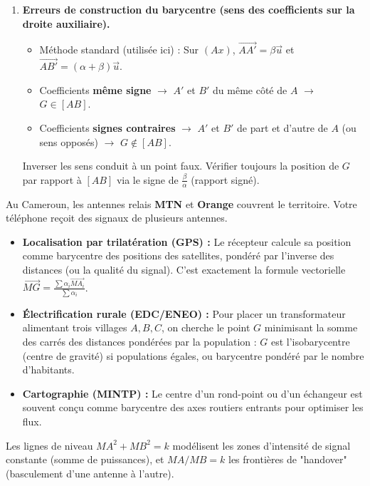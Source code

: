 \documentclass[11pt]{article}
\begin{document}
\begin{attention}
\begin{enumerate}
    \item \textbf{Erreurs de construction du barycentre (sens des coefficients sur la droite auxiliaire).}
    \begin{itemize}
        \item Méthode standard (utilisée ici) : Sur $(Ax)$, $\overrightarrow{AA'} = \beta \vec{u}$ et $\overrightarrow{AB'} = (\alpha+\beta)\vec{u}$.
        \item Coefficients \textbf{même signe} $\rightarrow$ $A'$ et $B'$ du même côté de $A$ $\rightarrow$ $G \in [AB]$.
        \item Coefficients \textbf{signes contraires} $\rightarrow$ $A'$ et $B'$ de part et d'autre de $A$ (ou sens opposés) $\rightarrow$ $G \notin [AB]$.
    \end{itemize}
    Inverser les sens conduit à un point faux. Vérifier toujours la position de $G$ par rapport à $[AB]$ via le signe de $\frac{\beta}{\alpha}$ (rapport signé).
\end{enumerate}
\end{attention}

\begin{savaistu}
Au Cameroun, les antennes relais \textbf{MTN} et \textbf{Orange} couvrent le territoire. Votre téléphone reçoit des signaux de plusieurs antennes.
\begin{itemize}
    \item \textbf{Localisation par trilatération (GPS) :} Le récepteur calcule sa position comme barycentre des positions des satellites, pondéré par l'inverse des distances (ou la qualité du signal). C'est exactement la formule vectorielle $\overrightarrow{MG} = \frac{\sum \alpha_i \overrightarrow{MA_i}}{\sum \alpha_i}$.
    \item \textbf{Électrification rurale (EDC/ENEO) :} Pour placer un transformateur alimentant trois villages $A, B, C$, on cherche le point $G$ minimisant la somme des carrés des distances pondérées par la population : $G$ est l'isobarycentre (centre de gravité) si populations égales, ou barycentre pondéré par le nombre d'habitants.
    \item \textbf{Cartographie (MINTP) :} Le centre d'un rond-point ou d'un échangeur est souvent conçu comme barycentre des axes routiers entrants pour optimiser les flux.
\end{itemize}
Les lignes de niveau $MA^2+MB^2=k$ modélisent les zones d'intensité de signal constante (somme de puissances), et $MA/MB=k$ les frontières de "handover" (basculement d'une antenne à l'autre).
\end{savaistu}
\end{document}
